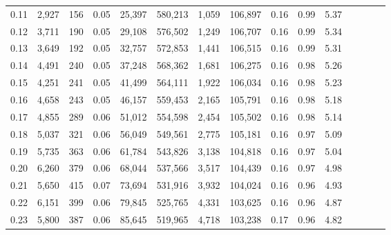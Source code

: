 \begin{tabular}{rrrcrrrrrrrrrrr}
0.11 &   2,927 &    156 &                                       0.05 &   25,397 &  580,213 &    1,059 &  106,897 &  0.16 &  0.99 &                         5.37 \\
0.12 &   3,711 &    190 &                                       0.05 &   29,108 &  576,502 &    1,249 &  106,707 &  0.16 &  0.99 &                         5.34 \\
0.13 &   3,649 &    192 &                                       0.05 &   32,757 &  572,853 &    1,441 &  106,515 &  0.16 &  0.99 &                         5.31 \\
0.14 &   4,491 &    240 &                                       0.05 &   37,248 &  568,362 &    1,681 &  106,275 &  0.16 &  0.98 &                         5.26 \\
0.15 &   4,251 &    241 &                                       0.05 &   41,499 &  564,111 &    1,922 &  106,034 &  0.16 &  0.98 &                         5.23 \\
0.16 &   4,658 &    243 &                                       0.05 &   46,157 &  559,453 &    2,165 &  105,791 &  0.16 &  0.98 &                         5.18 \\
0.17 &   4,855 &    289 &                                       0.06 &   51,012 &  554,598 &    2,454 &  105,502 &  0.16 &  0.98 &                         5.14 \\
0.18 &   5,037 &    321 &                                       0.06 &   56,049 &  549,561 &    2,775 &  105,181 &  0.16 &  0.97 &                         5.09 \\
0.19 &   5,735 &    363 &                                       0.06 &   61,784 &  543,826 &    3,138 &  104,818 &  0.16 &  0.97 &                         5.04 \\
0.20 &   6,260 &    379 &                                       0.06 &   68,044 &  537,566 &    3,517 &  104,439 &  0.16 &  0.97 &                         4.98 \\
0.21 &   5,650 &    415 &                                       0.07 &   73,694 &  531,916 &    3,932 &  104,024 &  0.16 &  0.96 &                         4.93 \\
0.22 &   6,151 &    399 &                                       0.06 &   79,845 &  525,765 &    4,331 &  103,625 &  0.16 &  0.96 &                         4.87 \\
0.23 &   5,800 &    387 &                                       0.06 &   85,645 &  519,965 &    4,718 &  103,238 &  0.17 &  0.96 &                         4.82 \\

\end{tabular}
